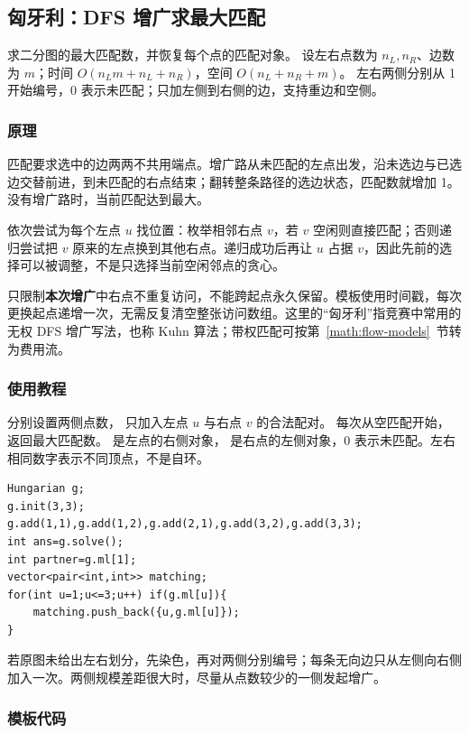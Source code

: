 \subsection{匈牙利：DFS 增广求最大匹配}
\label{algo:hungarian}
\AlgorithmInfo
    {求二分图的最大匹配数，并恢复每个点的匹配对象。}
    {设左右点数为 $n_L,n_R$、边数为 $m$；时间 $O(n_Lm+n_L+n_R)$，空间 $O(n_L+n_R+m)$。}
    {左右两侧分别从 1 开始编号，0 表示未匹配；只加左侧到右侧的边，支持重边和空侧。}

\subsubsection*{原理}
匹配要求选中的边两两不共用端点。增广路从未匹配的左点出发，沿未选边与已选边交替前进，到未匹配的右点结束；翻转整条路径的选边状态，匹配数就增加 1。没有增广路时，当前匹配达到最大。

依次尝试为每个左点 $u$ 找位置：枚举相邻右点 $v$，若 $v$ 空闲则直接匹配；否则递归尝试把 $v$ 原来的左点换到其他右点。递归成功后再让 $u$ 占据 $v$，因此先前的选择可以被调整，不是只选择当前空闲邻点的贪心。

 只限制\textbf{本次增广}中右点不重复访问，不能跨起点永久保留。模板使用时间戳，每次更换起点递增一次，无需反复清空整张访问数组。这里的“匈牙利”指竞赛中常用的无权 DFS 增广写法，也称 Kuhn 算法；带权匹配可按第~\ref{math:flow-models}~节转为费用流。

\subsubsection*{使用教程}
 分别设置两侧点数， 只加入左点 $u$ 与右点 $v$ 的合法配对。 每次从空匹配开始，返回最大匹配数。 是左点的右侧对象， 是右点的左侧对象，0 表示未匹配。左右相同数字表示不同顶点，不是自环。
\begin{lstlisting}[style=mtycpp,numbers=none]
Hungarian g;
g.init(3,3);
g.add(1,1),g.add(1,2),g.add(2,1),g.add(3,2),g.add(3,3);
int ans=g.solve();
int partner=g.ml[1];
vector<pair<int,int>> matching;
for(int u=1;u<=3;u++) if(g.ml[u]){
	matching.push_back({u,g.ml[u]});
}
\end{lstlisting}
若原图未给出左右划分，先染色，再对两侧分别编号；每条无向边只从左侧向右侧加入一次。两侧规模差距很大时，尽量从点数较少的一侧发起增广。

\subsubsection*{模板代码}

